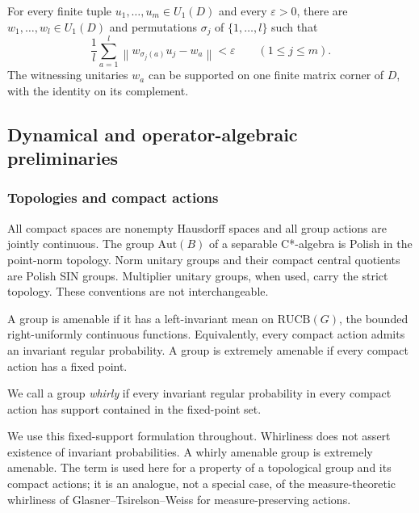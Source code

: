 \begin{theorem}\label{thm:cu-finite-main}
 For every finite tuple $u_1,\ldots,u_m\in U_1(D)$
and every $\varepsilon>0$, there are $w_1,\ldots,w_l\in U_1(D)$ and
permutations $\sigma_j$ of $\{1,\ldots,l\}$ such that 
\begin{equation*}
\frac1l\sum_{a=1}^l \left\|w_{\sigma_j(a)}u_j-w_a\right\|<\varepsilon
\qquad(1\leq j\leq m).
\end{equation*}
The witnessing unitaries $w_a$ can be supported on one finite matrix corner
of $D$, with the identity on its complement.
\end{theorem}

\subsection{Dynamical and operator-algebraic preliminaries}

\label{sec:cu-prelim}


\subsubsection{Topologies and compact actions}

All compact spaces are nonempty Hausdorff spaces and all group actions are
jointly continuous. The group $\mathrm{Aut}(B)$ of a separable C*-algebra
is Polish in the point-norm topology. Norm unitary groups and their compact
central quotients are Polish SIN groups. Multiplier unitary groups, when
used, carry the strict topology. These conventions are not interchangeable.

A group is amenable if it has a left-invariant mean on $\mathrm{RUCB}(G)$,
the bounded right-uniformly continuous functions. Equivalently, every
compact action admits an invariant regular probability. A group is extremely
amenable if every compact action has a fixed point.

\begin{definition}\label{def:cu-definition-1}
We call a group \emph{whirly} if every invariant regular probability in
every compact action has support contained in the fixed-point set.
\end{definition}

We use this fixed-support formulation throughout. Whirliness does not assert
existence of invariant probabilities. A whirly amenable group is extremely
amenable. The term is used here for a property of a topological group and
its compact actions; it is an analogue, not a special case, of the
measure-theoretic whirliness of Glasner--Tsirelson--Weiss \cite{GlasnerTsirelsonWeiss2005} for
measure-preserving actions.

